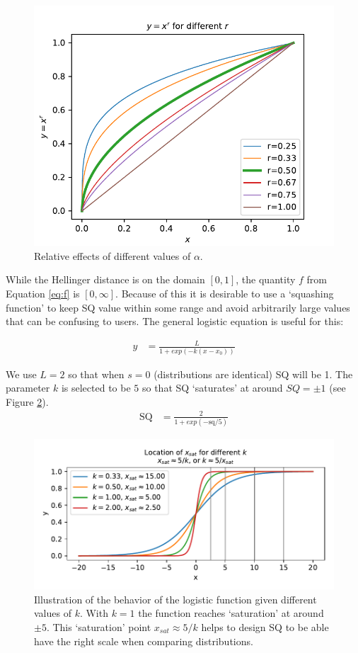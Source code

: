 \begin{figure}[htbp]
    \centering
    \includegraphics[width=0.9\linewidth]{Figures/power_comparison}
    \caption{Relative effects of different values of $\alpha$.}
    \label{fig:alphas}
\end{figure}

While the Hellinger distance is on the domain $[0,1]$, the quantity $f$ from Equation \ref{eq:f} is $[0,\infty]$. Because of this it is desirable to use a `squashing function' to keep SQ value within some range and avoid arbitrarily large values that can be confusing to users. The general logistic equation is useful for this:

\begin{align}
    y &= \frac{L}{1+exp(-k(x-x_0))} \label{eq:get_log}
\end{align}

We use $L=2$ so that when $s=0$ (distributions are identical) SQ will be 1. The parameter $k$ is selected to be $5$ so that SQ `saturates' at around $SQ=\pm1$ (see Figure \ref{fig:log_sat}).
\begin{align}
    \text{SQ} &= \frac{2}{1+exp(-\text{sq}/5)}\label{eq:SQ}
\end{align}
\begin{figure}[htbp]
    \centering
    \includegraphics[width=0.9\linewidth]{Figures/logistic_saturation}
    \caption{Illustration of the behavior of the logistic function given different values of $k$. With $k=1$ the function reaches `saturation' at around $\pm5$. This `saturation' point $x_{sat}\approx 5/k$ helps to design SQ to be able have the right scale when comparing distributions.}
    \label{fig:log_sat}
\end{figure}

